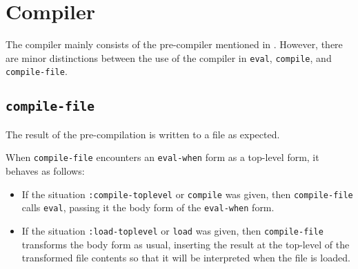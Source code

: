 \chapter{Compiler}
\label{chap-compiler}

The compiler mainly consists of the pre-compiler mentioned in
.  However,
there are minor distinctions between the use of the compiler in
\texttt{eval}, \texttt{compile}, and \texttt{compile-file}.

\section{\texttt{compile-file}}

The result of the pre-compilation is written to a file as expected.

When \texttt{compile-file} encounters an \texttt{eval-when} form as a
top-level form, it behaves as follows:

\begin{itemize}
\item If the situation \texttt{:compile-toplevel} or \texttt{compile}
  was given, then \texttt{compile-file} calls \texttt{eval}, passing
  it the body form of the \texttt{eval-when} form.
\item If the situation \texttt{:load-toplevel} or \texttt{load} was
  given, then \texttt{compile-file} transforms the body form as usual,
  inserting the result at the top-level of the transformed file
  contents so that it will be interpreted when the file is loaded.
\end{itemize}

